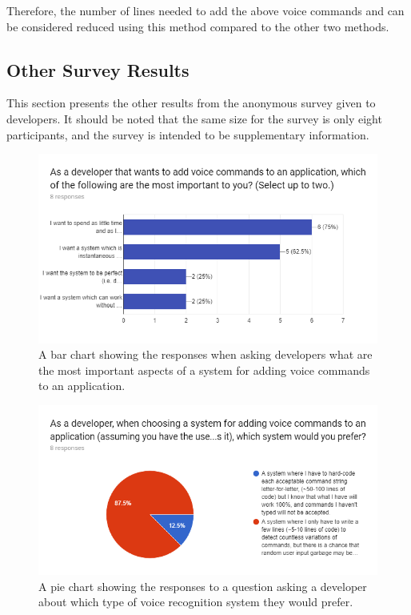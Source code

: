 \documentclass[11pt]{article}
\begin{document}
\begin{appendices}
Therefore, the number of lines needed to add the above voice commands and can be considered reduced using this method compared to the other two methods.

\newpage
\subsection{Other Survey Results}
\label{appendix:survey-results}

This section presents the other results from the anonymous survey given to developers. It should be noted that the same size for the survey is only eight participants, and the survey is intended to be supplementary information.

\begin{center}
\begin{figure}[H]
\begin{center}
  \includegraphics[width=\linewidth]{survey-important}
  \caption{A bar chart showing the responses when asking developers what are the most important aspects of a system for adding voice commands to an application.}
  \label{fig:survey-important}
  \end{center}
\end{figure}
\end{center}

\begin{center}
\begin{figure}[H]
\begin{center}
  \includegraphics[width=\linewidth]{survey-tradeoff}
  \caption{A pie chart showing the responses to a question asking a developer about which type of voice recognition system they would prefer.}
  \label{fig:survey-tradeoff}
  \end{center}
\end{figure}
\end{center}


\end{appendices}
\end{document}

